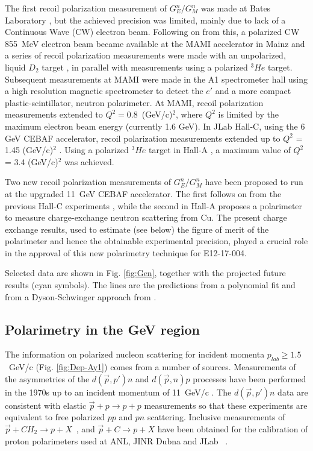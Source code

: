 \documentclass[epj]{svjour}
\begin{document}
The first recoil polarization  measurement of $G_{E}^{n}/G_{M}^{n}$ was made
at Bates Laboratory \cite{Eden:1994ji}, but the achieved precision was
limited, mainly due to lack of a Continuous Wave (CW) electron beam.
Following on from this, a polarized CW 855~MeV electron beam became
available at the MAMI accelerator in Mainz and a series of recoil polarization  measurements
were made with an unpolarized, liquid $D_2$ target \cite{Herberg:1999ud,Ostrick:1999xa},
in parallel with measurements using a polarized $^3\!He$ target. 
Subsequent measurements at MAMI were made in the A1 spectrometer hall
\cite{Glazier:2004ny} using a high resolution magnetic spectrometer to detect
the $e'$ and a more compact plastic-scintillator, neutron polarimeter.
At MAMI, recoil polarization  measurements extended to ${Q}^{2}=0.8$~(GeV/c)$^{2}$,
where ${Q}^{2}$ is limited by the maximum electron beam energy (currently
1.6 GeV). In JLab Hall-C, using the 6 GeV CEBAF accelerator, recoil polarization  measurements extended up to $Q^2$ = 1.45 (GeV/c)$^2$ \cite{Plaster:2005cx,Madey:2003av}. Using a polarized $^3\! He$ target in Hall-A \cite{Riordan:2010id}, a maximum value of $Q^2$ = 3.4 (GeV/c)$^2$ was achieved. 

Two new recoil polarization  measurements of $G_{E}^{n}/G_{M}^{n}$ have been
proposed to run at the upgraded 11~GeV CEBAF accelerator. The first  
follows on from the previous Hall-C experiments \cite{PR12-11-009}, while the second in Hall-A \cite{PR12-17-004} proposes a polarimeter to measure charge-exchange
neutron scattering from Cu. The present charge exchange results, used to estimate (see below) the figure of merit of the polarimeter and hence the obtainable experimental precision, played a crucial role in the approval of this new polarimetry technique for E12-17-004.

Selected data are shown in Fig. \ref{fig:Gen}, together with the  projected future results (cyan symbols). The lines are the predictions from a polynomial fit and from a Dyson-Schwinger approach from \cite{Roberts:1994dr}.  


\subsection{Polarimetry in the GeV region}
The information on polarized nucleon scattering for incident momenta $p_{lab}\ge 1.5$~GeV/c (Fig. \ref{fig:Dep-Ay1})
comes from a number of sources. Measurements of the asymmetries of the $d(\vec{p},p')n$ and $d(\vec{p},n)p$
processes have been performed in the 1970s up to an incident momentum of 11~GeV/c \cite{PhysRevLett.35.632,Kramer:1977pf}. The  $d(\vec{p},p')n$ data are consistent with elastic $\vec{p}+ p \to  p+p$
measurements \cite{Spinka:1983rz} so that these experiments are equivalent to free polarized $pp$
and $pn$ scattering. Inclusive measurements of $\vec{p}+CH_{2} \to p+X$~\cite{Azhgirey:2004yk},
and $\vec{p}+ C \to p+X$ have
been obtained for the calibration of proton polarimeters used at ANL,
JINR Dubna and JLab ~\cite{Cheung:1995ei,Alekseev:1999ag}.
\end{document}
